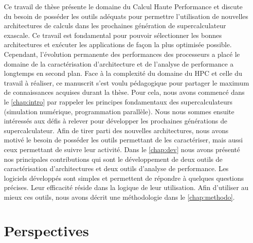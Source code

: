     
    Ce travail de thèse présente le domaine du Calcul Haute Performance et discute du besoin de posséder les outils adéquats pour permettre l'utilisation de nouvelles architectures de calculs dans les prochaines génération de supercalculateur \gls{exascale}. Ce travail est fondamental pour pouvoir sélectionner les bonnes architectures et exécuter les applications de façon la plus optimisée possible. Cependant, l'évolution permanente des performances des processeurs a placé le domaine de la caractérisation d'architecture et de l'analyse de performance a longtemps en second plan.
    Face à la complexité du domaine du HPC et celle du travail à réaliser, ce manuscrit s'est voulu pédagogique pour partager le maximum de connaissances acquises durant la thèse. Pour cela, nous avons commencé dans le \autoref{chap:intro} par rappeler les principes fondamentaux des supercalculateurs (simulation numérique, programmation parallèle). Nous nous sommes ensuite intéressés aux défis à relever pour développer les prochaines générations de supercalculateur. Afin de tirer parti des nouvelles architectures, nous avons motivé le besoin de posséder les outils permettant de les caractériser, mais aussi ceux permettant de suivre leur activité. Dans le \autoref{chap:dev} nous avons présenté nos principales contributions qui sont le développement de deux outils de caractérisation d'architectures et deux outils d'analyse de performance. Les logiciels développés sont simples et permettent de répondre à quelques questions précises. Leur efficacité réside dans la logique de leur utilisation. Afin d'utiliser au mieux ces outils, nous avons décrit une méthodologie dans le \autoref{chap:methodo}.
        
     
\section*{Perspectives}
    
